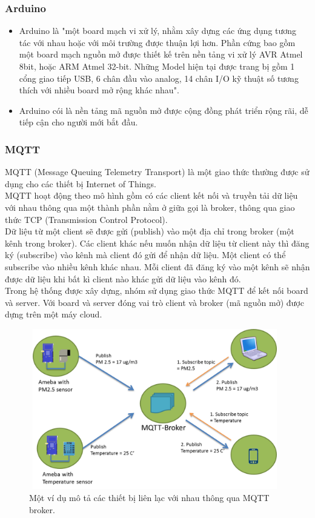 \documentclass[a4paper,12pt,oneside]{article}
\begin{document}
\subsubsection{Arduino}
\begin{itemize}
\item Arduino là "một board mạch vi xử lý, nhằm xây dựng các ứng dụng tương tác với nhau hoặc với môi trường được thuận lợi hơn. Phần cứng bao gồm một board mạch nguồn mở được thiết kế trên nền tảng vi xử lý AVR Atmel 8bit, hoặc ARM Atmel 32-bit. Những Model hiện tại được trang bị gồm 1 cổng giao tiếp USB, 6 chân đầu vào analog, 14 chân I/O kỹ thuật số tương thích với nhiều board mở rộng khác nhau"\cite{arduino}.
\item Arduino cói là nền tảng mã nguồn mở được cộng đồng phát triển rộng rãi, dễ tiếp cận cho người mới bắt đầu.
\end{itemize}

\subsubsection{MQTT}
\noindent MQTT (Message Queuing Telemetry Transport) là một giao thức thường được sử dụng cho các thiết bị Internet of Things.\\
MQTT hoạt động theo mô hình gồm có các client kết nối và truyền tải dữ liệu với nhau thông qua một thành phần nằm ở giữa gọi là broker, thông qua giao thức TCP (Transmission Control Protocol).\\
Dữ liệu từ một client sẽ được gửi (publish) vào một địa chỉ trong broker (một kênh trong broker). Các client khác nếu muốn nhận dữ liệu từ client này thì đăng ký (subscribe) vào kênh mà client đó gửi để nhận dữ liệu. Một client có thể subscribe vào nhiều kênh khác nhau. Mỗi client đã đăng ký vào một kênh sẽ nhận được dữ liệu khi bất kì client nào khác gửi dữ liệu vào kênh đó.\\
Trong hệ thống được xây dựng, nhóm sử dụng giao thức MQTT để kết nối board và server. Với board và server đóng vai trò client và broker (mã nguồn mở) được dựng trên một máy cloud.

\begin{figure}[H]
	\centering
	\includegraphics[height=7cm,width=11cm]{hinh/mqtt.png}
	\caption{Một ví dụ mô tả các thiết bị liên lạc với nhau thông qua MQTT broker\cite{mqtt}.}
	\label{fig:mqtt}
\end{figure}
\end{document}
